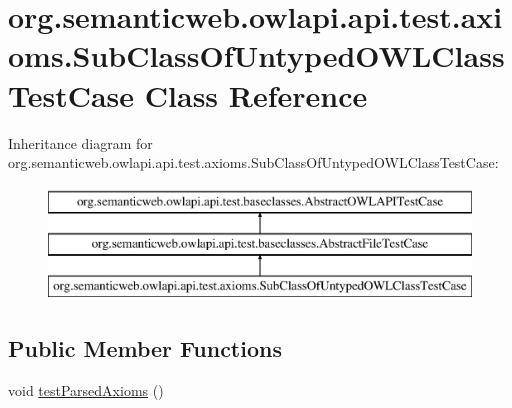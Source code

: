 \hypertarget{classorg_1_1semanticweb_1_1owlapi_1_1api_1_1test_1_1axioms_1_1_sub_class_of_untyped_o_w_l_class_test_case}{\section{org.\-semanticweb.\-owlapi.\-api.\-test.\-axioms.\-Sub\-Class\-Of\-Untyped\-O\-W\-L\-Class\-Test\-Case Class Reference}
\label{classorg_1_1semanticweb_1_1owlapi_1_1api_1_1test_1_1axioms_1_1_sub_class_of_untyped_o_w_l_class_test_case}
}
Inheritance diagram for org.\-semanticweb.\-owlapi.\-api.\-test.\-axioms.\-Sub\-Class\-Of\-Untyped\-O\-W\-L\-Class\-Test\-Case\-:\begin{figure}[H]
\begin{center}
\leavevmode
\includegraphics[height=3.000000cm]{classorg_1_1semanticweb_1_1owlapi_1_1api_1_1test_1_1axioms_1_1_sub_class_of_untyped_o_w_l_class_test_case}
\end{center}
\end{figure}
\subsection*{Public Member Functions}
\begin{DoxyCompactItemize}
\item 
void \hyperlink{classorg_1_1semanticweb_1_1owlapi_1_1api_1_1test_1_1axioms_1_1_sub_class_of_untyped_o_w_l_class_test_case_a67a2f6d67415301157b381227cf31032}{test\-Parsed\-Axioms} ()
\end{DoxyCompactItemize}

